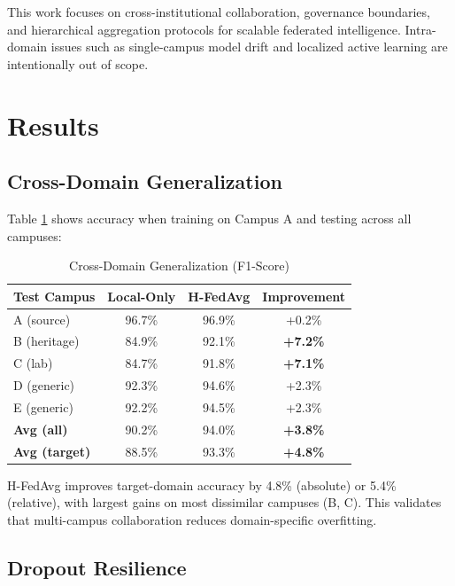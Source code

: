 \documentclass[conference]{IEEEtran}
\begin{document}
This work focuses on cross-institutional collaboration, governance boundaries, and hierarchical aggregation protocols for scalable federated intelligence. Intra-domain issues such as single-campus model drift and localized active learning are intentionally out of scope.

\section{Results}

\subsection{Cross-Domain Generalization}

Table \ref{tab:cross_domain} shows accuracy when training on Campus A and testing across all campuses:

\begin{table}[h]
\centering
\caption{Cross-Domain Generalization (F1-Score)}
\label{tab:cross_domain}
\begin{tabular}{lccc}
\toprule
\textbf{Test Campus} & \textbf{Local-Only} & \textbf{H-FedAvg} & \textbf{Improvement} \\
\midrule
A (source) & 96.7\% & 96.9\% & +0.2\% \\
B (heritage) & 84.9\% & 92.1\% & \textbf{+7.2\%} \\
C (lab) & 84.7\% & 91.8\% & \textbf{+7.1\%} \\
D (generic) & 92.3\% & 94.6\% & +2.3\% \\
E (generic) & 92.2\% & 94.5\% & +2.3\% \\
\midrule
\textbf{Avg (all)} & 90.2\% & 94.0\% & \textbf{+3.8\%} \\
\textbf{Avg (target)} & 88.5\% & 93.3\% & \textbf{+4.8\%} \\
\bottomrule
\end{tabular}
\end{table}

H-FedAvg improves target-domain accuracy by 4.8\% (absolute) or 5.4\% (relative), with largest gains on most dissimilar campuses (B, C). This validates that multi-campus collaboration reduces domain-specific overfitting.

\subsection{Dropout Resilience}
\end{document}
